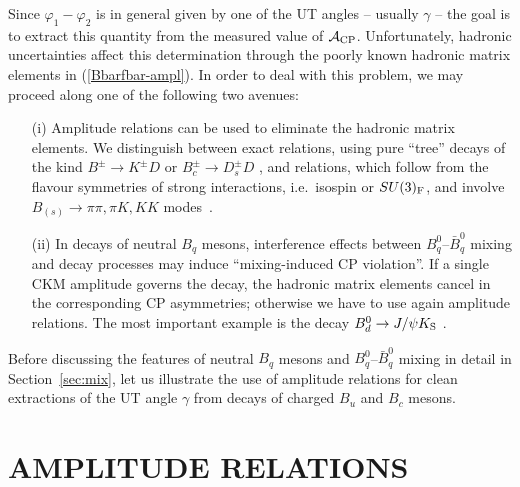 \documentclass[12pt]{article}
\begin{document}
Since $\varphi_1-\varphi_2$ is in general given by one of the UT angles  -- 
usually $\gamma$ -- the goal is to extract this quantity from the measured 
value of ${\cal A}_{\rm CP}$. Unfortunately, hadronic uncertainties affect this
determination through the poorly known hadronic matrix elements in 
(\ref{Bbarfbar-ampl}). In order to deal with this problem, we may proceed along 
one of the following two avenues:
\begin{itemize}
\item[(i)] Amplitude relations can be used to eliminate the 
hadronic matrix elements. We distinguish between exact relations, 
using pure ``tree'' decays  of the kind $B^\pm\to K^\pm D$ \cite{gw,ADS} or 
$B_c^\pm\to D^\pm_s D$ \cite{fw}, and relations, which follow from the flavour symmetries 
of strong interactions, i.e.\ isospin or $SU(3)_{\rm F}$, and involve 
$B_{(s)}\to\pi\pi,\pi K,KK$ modes~\cite{GHLR}. 
\item[(ii)] In decays of neutral $B_q$ mesons, interference effects 
between $B^0_q$--$\bar B^0_q$ mixing and decay processes may induce
 ``mixing-induced CP violation''. If a single CKM amplitude governs the decay, 
 the hadronic matrix elements cancel in the corresponding
CP asymmetries; otherwise we have to use again amplitude relations.
The most important example is the decay $B^0_d\to J/\psi K_{\rm S}$ \cite{bisa}.
\end{itemize}
Before discussing the features of neutral $B_q$ mesons and  
$B^0_q$--$\bar B^0_q$ mixing in detail in Section~\ref{sec:mix}, let us illustrate
the use of amplitude relations for clean extractions of the UT angle $\gamma$
from decays of charged $B_u$ and $B_c$ mesons. 


%
%
%
\section{AMPLITUDE RELATIONS}\label{sec:A-REL}
\setcounter{equation}{0}
%
%
%
\boldmath
\end{document}

